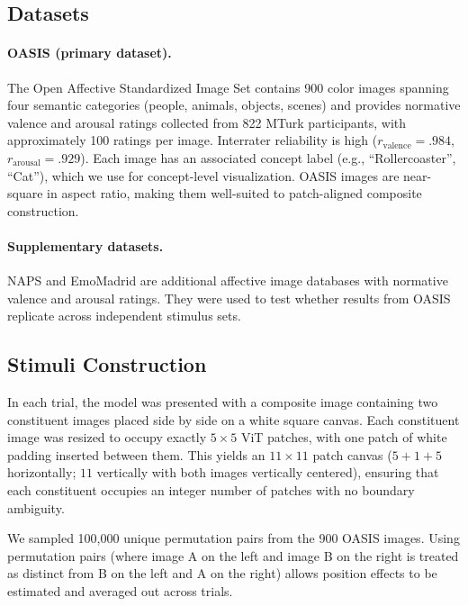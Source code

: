 \documentclass[12pt]{article}
\begin{document}
\subsection{Datasets}

\paragraph{OASIS (primary dataset).}
The Open Affective Standardized Image Set \citep{kurdiIntroducingOpenAffective2017} contains 900 color images spanning four semantic categories (people, animals, objects, scenes) and provides normative valence and arousal ratings collected from 822 MTurk participants, with approximately 100 ratings per image. Interrater reliability is high ($r_\text{valence} = .984$, $r_\text{arousal} = .929$). Each image has an associated concept label (e.g., ``Rollercoaster'', ``Cat''), which we use for concept-level visualization. OASIS images are near-square in aspect ratio, making them well-suited to patch-aligned composite construction.

\paragraph{Supplementary datasets.}
NAPS and EmoMadrid are additional affective image databases with normative valence and arousal ratings. They were used to test whether results from OASIS replicate across independent stimulus sets.

\subsection{Stimuli Construction}

In each trial, the model was presented with a composite image containing two constituent images placed side by side on a white square canvas. Each constituent image was resized to occupy exactly $5 \times 5$ ViT patches, with one patch of white padding inserted between them. This yields an $11 \times 11$ patch canvas ($5 + 1 + 5$ horizontally; $11$ vertically with both images vertically centered), ensuring that each constituent occupies an integer number of patches with no boundary ambiguity.

We sampled 100,000 unique permutation pairs from the 900 OASIS images. Using permutation pairs (where image A on the left and image B on the right is treated as distinct from B on the left and A on the right) allows position effects to be estimated and averaged out across trials.
\end{document}
